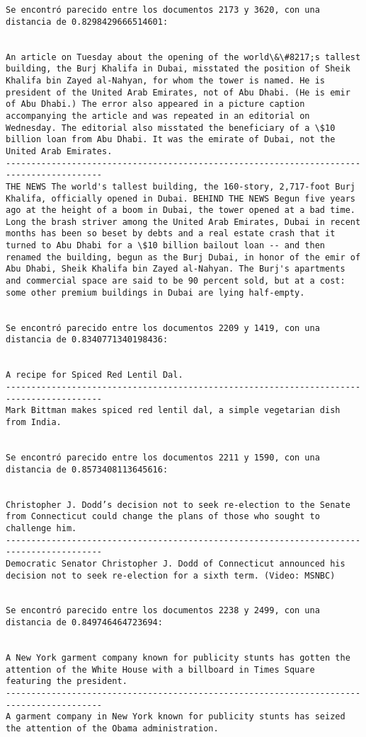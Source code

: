 \documentclass[11pt]{article}
\begin{document}
\begin{Verbatim}[commandchars=\\\{\}]
Se encontró parecido entre los documentos 2173 y 3620, con una distancia de 0.8298429666514601:


An article on Tuesday about the opening of the world\&\#8217;s tallest building, the Burj Khalifa in Dubai, misstated the position of Sheik Khalifa bin Zayed al-Nahyan, for whom the tower is named. He is president of the United Arab Emirates, not of Abu Dhabi. (He is emir of Abu Dhabi.) The error also appeared in a picture caption accompanying the article and was repeated in an editorial on Wednesday. The editorial also misstated the beneficiary of a \$10 billion loan from Abu Dhabi. It was the emirate of Dubai, not the United Arab Emirates.
-----------------------------------------------------------------------------------------
THE NEWS The world's tallest building, the 160-story, 2,717-foot Burj Khalifa, officially opened in Dubai. BEHIND THE NEWS Begun five years ago at the height of a boom in Dubai, the tower opened at a bad time. Long the brash striver among the United Arab Emirates, Dubai in recent months has been so beset by debts and a real estate crash that it turned to Abu Dhabi for a \$10 billion bailout loan -- and then renamed the building, begun as the Burj Dubai, in honor of the emir of Abu Dhabi, Sheik Khalifa bin Zayed al-Nahyan. The Burj's apartments and commercial space are said to be 90 percent sold, but at a cost: some other premium buildings in Dubai are lying half-empty.


Se encontró parecido entre los documentos 2209 y 1419, con una distancia de 0.8340771340198436:


A recipe for Spiced Red Lentil Dal.
-----------------------------------------------------------------------------------------
Mark Bittman makes spiced red lentil dal, a simple vegetarian dish from India.


Se encontró parecido entre los documentos 2211 y 1590, con una distancia de 0.8573408113645616:


Christopher J. Dodd’s decision not to seek re-election to the Senate from Connecticut could change the plans of those who sought to challenge him.
-----------------------------------------------------------------------------------------
Democratic Senator Christopher J. Dodd of Connecticut announced his decision not to seek re-election for a sixth term. (Video: MSNBC)


Se encontró parecido entre los documentos 2238 y 2499, con una distancia de 0.849746464723694:


A New York garment company known for publicity stunts has gotten the attention of the White House with a billboard in Times Square featuring the president.
-----------------------------------------------------------------------------------------
A garment company in New York known for publicity stunts has seized the attention of the Obama administration.



\end{Verbatim}
\end{document}
